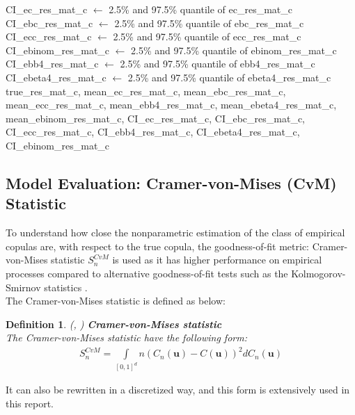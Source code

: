 \documentclass[12pt]{report}
\newtheorem{definition}{Definition}[subsection]
\newcommand{\1}{\mathbf{1}}
\begin{document}
\begin{flushleft}
\begin{algorithm}[H]
\begin{algorithmic}
    \State CI\_ec\_res\_mat\_c $\gets$ 2.5\% and 97.5\% quantile of ec\_res\_mat\_c
    \State CI\_ebc\_res\_mat\_c $\gets$ 2.5\% and 97.5\% quantile of ebc\_res\_mat\_c
    \State CI\_ecc\_res\_mat\_c $\gets$ 2.5\% and 97.5\% quantile of ecc\_res\_mat\_c
    \State CI\_ebinom\_res\_mat\_c $\gets$ 2.5\% and 97.5\% quantile of ebinom\_res\_mat\_c
    \State CI\_ebb4\_res\_mat\_c $\gets$ 2.5\% and 97.5\% quantile of ebb4\_res\_mat\_c
    \State CI\_ebeta4\_res\_mat\_c $\gets$ 2.5\% and 97.5\% quantile of ebeta4\_res\_mat\_c
    \State \Return true\_res\_mat\_c, mean\_ec\_res\_mat\_c, mean\_ebc\_res\_mat\_c, mean\_ecc\_res\_mat\_c, mean\_ebb4\_res\_mat\_c, mean\_ebeta4\_res\_mat\_c, mean\_ebinom\_res\_mat\_c, CI\_ec\_res\_mat\_c, CI\_ebc\_res\_mat\_c, CI\_ecc\_res\_mat\_c, CI\_ebb4\_res\_mat\_c, CI\_ebeta4\_res\_mat\_c, CI\_ebinom\_res\_mat\_c
\EndProcedure
\end{algorithmic}
\end{algorithm}

\subsection{Model Evaluation: Cramer-von-Mises (CvM) Statistic}
\vspace{0.5cm}
To understand how close the nonparametric estimation of the class of empirical copulas are, with respect to the true copula, the goodness-of-fit metric: Cramer-von-Mises statistic $S_{n}^{CvM}$ is used as it has higher performance on empirical processes compared to alternative goodness-of-fit tests such as the Kolmogorov-Smirnov statistics \parencite{GenestRemillardBeaudoinGOF2009}.\\
\vspace{0.5cm}
The Cramer-von-Mises statistic is defined as below:

\begin{definition}\label{CvMStatistics}
\textit{\normalfont(\cite{HofertBook}, \cite{GenestRemillardBeaudoinGOF2009})}\:
\textbf{Cramer-von-Mises statistic} \\
The Cramer-von-Mises statistic have the following form:
\begin{align*}
S_{n}^{CvM} = \int\limits_{[0,1]^d} n(C_{n}(\textbf{u}) - C(\textbf{u}))^{2} dC_{n}(\textbf{u})
\end{align*}
\end{definition}

It can also be rewritten in a discretized way, and this form is extensively used in this report.


\end{flushleft}
\end{document}
